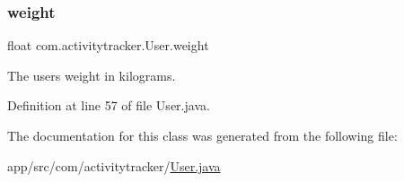 \subsubsection{\texorpdfstring{weight}{weight}}
{\footnotesize\ttfamily float com.\+activitytracker.\+User.\+weight\hspace{0.3cm}{\ttfamily [private]}}

The user\textquotesingle{}s weight in kilograms. 

Definition at line 57 of file User.\+java.



The documentation for this class was generated from the following file\+:\begin{DoxyCompactItemize}
\item 
app/src/com/activitytracker/\mbox{\hyperlink{_user_8java}{User.\+java}}\end{DoxyCompactItemize}
